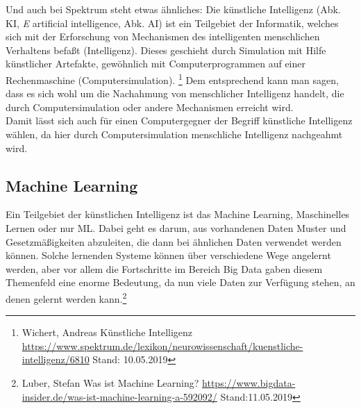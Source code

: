 \documentclass[12pt,a4paper]{article}
\begin{document}
	Und auch bei Spektrum steht etwas ähnliches: \glqq Die künstliche Intelligenz (Abk. KI, \textit{E} artificial intelligence, Abk. AI) ist ein Teilgebiet der Informatik, welches sich mit der Erforschung von Mechanismen des intelligenten menschlichen Verhaltens befaßt (Intelligenz). Dieses geschieht durch Simulation mit Hilfe künstlicher Artefakte, gewöhnlich mit Computerprogrammen auf einer Rechenmaschine (Computersimulation).\grqq{} \footnote{Wichert, Andreas \glqq Künstliche Intelligenz \grqq{} \url{https://www.spektrum.de/lexikon/neurowissenschaft/kuenstliche-intelligenz/6810} Stand: 10.05.2019 }
	Dem entsprechend kann man sagen, dass es sich wohl um die Nachahmung von menschlicher Intelligenz handelt, die durch Computersimulation oder andere Mechanismen erreicht wird.\\
	Damit lässt sich auch für einen Computergegner der Begriff künstliche Intelligenz wählen, da hier durch Computersimulation menschliche Intelligenz nachgeahmt wird.
	\subsection{Machine Learning}
	Ein Teilgebiet der künstlichen Intelligenz ist das Machine Learning, Maschinelles Lernen oder nur ML. Dabei geht es darum, aus vorhandenen Daten Muster und Gesetzmäßigkeiten abzuleiten, die dann bei ähnlichen Daten verwendet werden können. Solche lernenden Systeme können über verschiedene Wege angelernt werden, aber vor allem die Fortschritte im Bereich Big Data gaben diesem Themenfeld  eine enorme Bedeutung, da nun viele Daten zur Verfügung stehen, an denen gelernt werden kann.\footnote{Luber, Stefan \glqq Was ist Machine Learning? \grqq{} \url{https://www.bigdata-insider.de/was-ist-machine-learning-a-592092/} Stand:11.05.2019}
\end{document}
